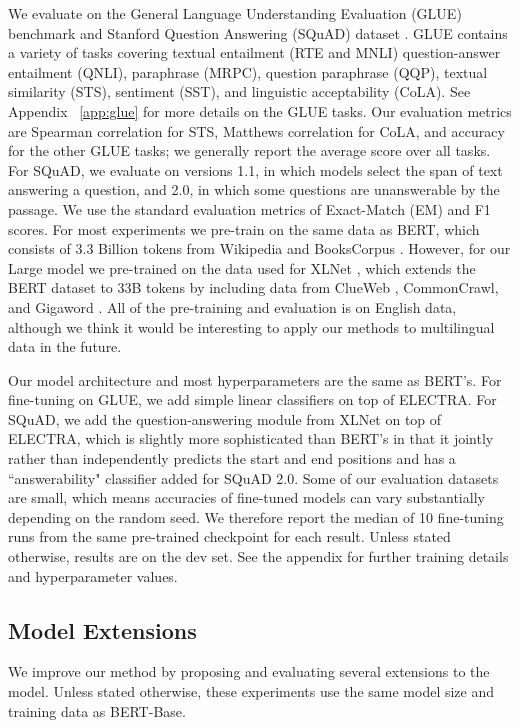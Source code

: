 \documentclass{article}
\begin{document}
We evaluate on the General Language Understanding Evaluation (GLUE) benchmark \citep{wang2018glue} and Stanford Question Answering (SQuAD) dataset \citep{Rajpurkar2016SQuAD10}. GLUE contains a variety of tasks covering textual entailment (RTE and MNLI) question-answer entailment (QNLI), paraphrase (MRPC), question paraphrase (QQP), textual similarity (STS), sentiment (SST), and linguistic acceptability (CoLA). See Appendix ~\ref{app:glue} for more details on the GLUE tasks.
Our evaluation metrics are Spearman correlation for STS, Matthews correlation for CoLA, and accuracy for the other GLUE tasks; we generally report the average score over all tasks. 
For SQuAD, we evaluate on versions 1.1, in which models select the span of text answering a question, and 2.0, in which some questions are unanswerable by the passage. 
We use the standard evaluation metrics of Exact-Match (EM) and F1 scores.  
For most experiments we pre-train on the same data as BERT, which consists of 3.3 Billion tokens from Wikipedia and BooksCorpus \citep{Zhu2015AligningBA}. 
However, for our Large model we pre-trained on the data used for XLNet \citep{yang2019xlnet}, which extends the BERT dataset to 33B tokens by including data from ClueWeb \citep{callan2009clueweb09}, CommonCrawl, and Gigaword \citep{ParkerGiga}. 
All of the pre-training and evaluation is on English data, although we think it would be interesting to apply our methods to multilingual data in the future. 

Our model architecture and most hyperparameters are the same as BERT's. 
For fine-tuning on GLUE, we add simple linear classifiers on top of ELECTRA.
For SQuAD, we add the question-answering module from XLNet on top of ELECTRA, which is slightly more sophisticated than BERT's in that it jointly rather than independently predicts the start and end positions and has a ``answerability" classifier added for SQuAD 2.0.
Some of our evaluation datasets are small, which means accuracies of fine-tuned models can vary substantially depending on the random seed. 
We therefore report the median of 10 fine-tuning runs from the same pre-trained checkpoint for each result.
Unless stated otherwise, results are on the dev set.
See the appendix for further training details and hyperparameter values.


\subsection{Model Extensions} 
\label{sec:extensions}
We improve our method by proposing and evaluating several extensions to the model. Unless stated otherwise, these experiments use the same model size and training data as BERT-Base.
\end{document}
